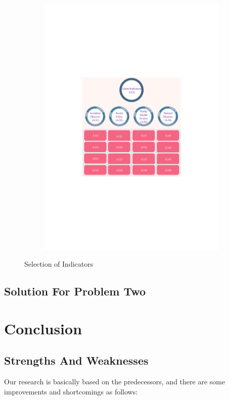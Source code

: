 \documentclass[12pt]{article}  %
\begin{document}
\begin{figure}[htbp]
\begin{subfigure}[b]{.32\textwidth}
\includegraphics[width=\textwidth]{img/3.pdf}
\end{subfigure}
\caption{Selection of Indicators}\label{soi}
\end{figure}

\subsection{Solution For Problem Two}

\newpage
\section{Conclusion}
\subsection{Strengths And Weaknesses}
Our research is basically based on the predecessors, and there are some improvements and shortcomings as follows:
\end{document}
